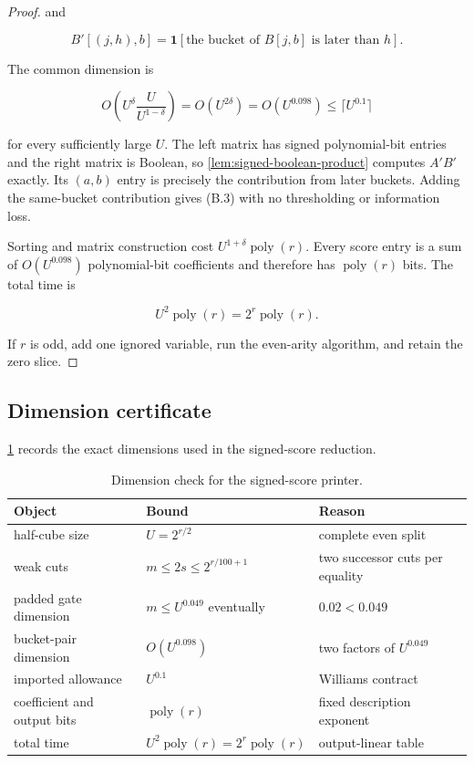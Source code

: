 \documentclass[11pt,letterpaper]{article}
\newcommand{\cref}[1]{\ref{#1}}
\let\Cref\cref
\theoremstyle{definition}
\theoremstyle{remark}
\begin{document}
\begin{proof}
and

\[
B'[(j,h),b]
{}={}
\mathbf1[
\text{the bucket of }B[j,b]
\text{ is later than }h].
\]

The common dimension is

\[
O\left(
U^\delta\frac{U}{U^{1-\delta}}
\right)
{}={}
O(U^{2\delta})
{}={}
O(U^{0.098})
\le
\lceil U^{0.1}\rceil
\]

for every sufficiently large \(U\). The left matrix has signed
polynomial-bit entries and the right matrix is Boolean, so \cref{lem:signed-boolean-product}
computes \(A'B'\) exactly. Its \((a,b)\) entry is precisely the
contribution from later buckets. Adding the same-bucket contribution
gives (B.3) with no thresholding or information loss.

Sorting and matrix construction cost
\(U^{1+\delta}\operatorname{poly}(r)\). Every score entry is a sum of
\(O(U^{0.098})\) polynomial-bit coefficients and therefore has
\(\operatorname{poly}(r)\) bits. The total time is

\[
U^2\operatorname{poly}(r)
{}={}
2^r\operatorname{poly}(r).
\]

If \(r\) is odd, add one ignored variable, run the even-arity algorithm,
and retain the zero slice. \end{proof}

\subsection{Dimension certificate}\label{b4-dimension-certificate}

\Cref{tab:dimension-certificate} records the exact dimensions used in
the signed-score reduction.

\begin{table}[t]
\centering
\caption{Dimension check for the signed-score printer.}
\label{tab:dimension-certificate}
\small
\begin{tabularx}{\textwidth}{@{}l>{\raggedleft\arraybackslash}p{}X@{}}
\toprule
\textbf{Object} & \textbf{Bound} & \textbf{Reason} \\
\midrule
half-cube size & \(U=2^{r/2}\) & complete even split \\
weak cuts & \(m\le2s\le2^{r/100+1}\) & two successor cuts per
equality \\
padded gate dimension & \(m\le U^{0.049}\) eventually &
\(0.02<0.049\) \\
bucket-pair dimension & \(O(U^{0.098})\) & two factors of
\(U^{0.049}\) \\
imported allowance & \(U^{0.1}\) & Williams contract \\
coefficient and output bits & \(\operatorname{poly}(r)\) & fixed
description exponent \\
total time & \(U^2\operatorname{poly}(r)=2^r\operatorname{poly}(r)\) &
output-linear table \\
\bottomrule
\end{tabularx}
\end{table}
\end{document}
